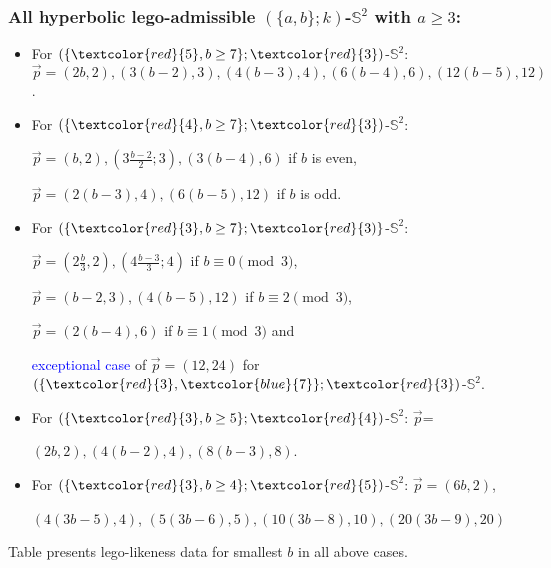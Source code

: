 \documentclass{beamer}
\begin{document}
\begin{frame}\frametitle{All hyperbolic lego-admissible   $(\{a,b\}; k)$-$\mathbb{S}^2$  with $a\ge 3$:}
\vspace{-2mm}



\begin{itemize}

\item  For $(\{\textcolor{red}{5},b\ge 7\};\textcolor{red}{3})$-$\mathbb{S}^2$:
 $\vec{p}=(2b,2),(3(b-2),3),(4(b-3),4),(6(b-4),6),(12(b-5),12)$.
 
\item     For $(\{\textcolor{red}{4},b\ge 7\};\textcolor{red}{3})$-$\mathbb{S}^2$:


$\vec{p}=(b,2),(3\frac{b-2}{2};3),(3(b-4),6)$ if $b$ is even, 

  $\vec{p} 
 =(2(b-3),4),(6(b-5),12)$ if  $b$ is odd.

\item  

   For $(\{\textcolor{red}{3},b\ge 7\};\textcolor{red}{3)}$-$\mathbb{S}^2$:
  
$\vec{p}=(2\frac{b}{3},2),(4\frac{b-3}{3};4)$ if $b\equiv 0 \pmod 3$, 

$\vec{p}  =(b-2,3),(4(b-5),12)$ if  $b\equiv 2 \pmod 3$,

 $\vec{p} = (2(b-4),6)$ if  $b\equiv 1 \pmod 3$
 and 
 
 \textcolor{blue}{ 
 exceptional case} of $\vec{p} = (12, 24)$ for
 $(\{\textcolor{red}{3},\textcolor{blue}{  7}\};\textcolor{red}{3})$-$\mathbb{S}^2$.
  
  
 
\item  For $(\{\textcolor{red}{3},b\ge 5\};\textcolor{red}{4})$-$\mathbb{S}^2$:
$\vec{p}$=

$(2b,2),(4(b-2),4),(8(b-3),8)$.


\item  For  $(\{\textcolor{red}{3},b\ge 4\}; \textcolor{red}{5})$-$\mathbb{S}^2$:
$\vec{p}=(6b,2)$,

$(4(3b-5),4)$,
$(5(3b-6),5),(10(3b-8),10), (20(3b-9),20)$

\end{itemize}


Table  
presents
lego-likeness data for  smallest   $b$ in  all above cases.


\end{frame}
\end{document}
